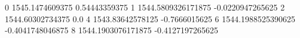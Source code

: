 0 1545.1474609375 0.54443359375
1 1544.5809326171875 -0.0220947265625
2 1544.60302734375 0.0
4 1543.83642578125 -0.7666015625
6 1544.1988525390625 -0.4041748046875
8 1544.1903076171875 -0.4127197265625
